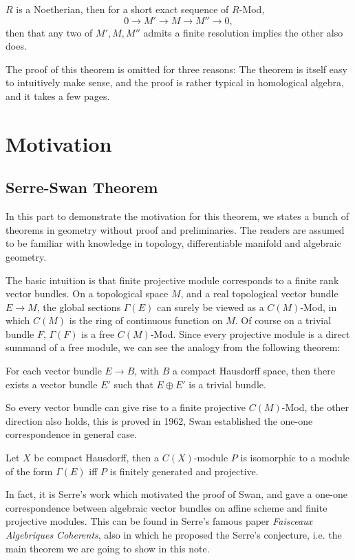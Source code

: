 \begin{thm}
	$R$ is a Noetherian, then for a short exact sequence of $R$-Mod,
	$$
	0\rightarrow M'\rightarrow M\rightarrow M''\rightarrow0,
	$$
	then that any two of $M',M,M''$ admits a finite resolution implies the other also does.
\end{thm}
\begin{rmk}
	The proof of this theorem is omitted for three reasons: The theorem is itself easy to intuitively make sense, and the proof is rather typical in homological algebra, and it takes a few pages.
\end{rmk}

\section{Motivation}
\subsection{Serre-Swan Theorem}
In this part to demonstrate the motivation for this theorem, we states a bunch of theorems in geometry without proof and preliminaries. The readers are assumed to be familiar with knowledge in topology, differentiable manifold and algebraic geometry.

The basic intuition is that finite projective module corresponds to a finite rank vector bundles. On a topological space $M$, and a real topological vector bundle $E\rightarrow M$, the global sections $\Gamma(E)$ can surely be viewed as a $C(M)$-Mod, in which $C(M)$ is the ring of continuous function on $M$. Of course on a trivial bundle $F$, $\Gamma(F)$ is a free $C(M)$-Mod. Since every projective module is a direct summand of a free module, we can see the analogy from the following theorem:
\begin{thm}
	For each vector bundle $E\rightarrow B$, with $B$ a compact Hausdorff space, then there exists a vector bundle $E'$ such that $E\oplus E'$ is a trivial bundle.
\end{thm}
So every vector bundle can give rise to a finite projective $C(M)$-Mod, the other direction also holds, this is proved in 1962\cite{Swan1962}, Swan established the one-one correspondence in general case.
\begin{thm}
	Let $X$ be compact Hausdorff, then a $C(X)$-module $P$ is isomorphic to a module of the form $\Gamma(E)$ iff $P$ is finitely generated and projective.
\end{thm}

In fact, it is Serre's work which motivated the proof of Swan, and gave a one-one correspondence between algebraic vector bundles on affine scheme and finite projective modules. This can be found in Serre's famous paper \textit{Faisceaux Algebriques Coherents}\cite{Serre1955}, also in which he proposed the Serre's conjecture, i.e. the main theorem we are going to show in this note.


